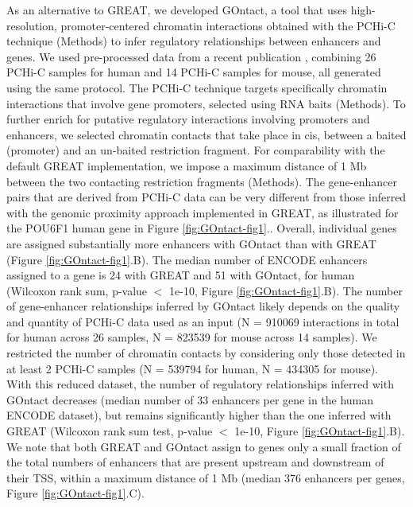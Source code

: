 As an alternative to GREAT, we developed GOntact, a tool that uses high-resolution, promoter-centered chromatin interactions obtained with the PCHi-C technique (Methods) to infer regulatory relationships between enhancers and genes. We used pre-processed data from a recent publication \citep{laverre_long-range_2022}, combining 26 PCHi-C samples for human and 14 PCHi-C samples for mouse, all generated using the same protocol. The PCHi-C technique targets specifically chromatin interactions that involve gene promoters, selected using RNA baits (Methods). To further enrich for putative regulatory interactions involving promoters and enhancers, we selected chromatin contacts that take place in cis, between a baited (promoter) and an un-baited restriction fragment. For comparability with the default GREAT implementation, we impose a maximum distance of 1 Mb between the two contacting restriction fragments (Methods). The gene-enhancer pairs that are derived from PCHi-C data can be very different from those inferred with the genomic proximity approach implemented in GREAT, as illustrated for the POU6F1 human gene in Figure \ref{fig:GOntact-fig1}.. Overall, individual genes are assigned substantially more enhancers with GOntact than with GREAT (Figure \ref{fig:GOntact-fig1}.B). The median number of ENCODE enhancers assigned to a gene is 24 with GREAT and 51 with GOntact, for human (Wilcoxon rank sum, p-value $<$ 1e-10, Figure \ref{fig:GOntact-fig1}.B). The number of gene-enhancer relationships inferred by GOntact likely depends on the quality and quantity of PCHi-C data used as an input (N = 910069 interactions in total for human across 26 samples, N = 823539 for mouse across 14 samples). We restricted the number of chromatin contacts by considering only those detected in at least 2 PCHi-C samples (N = 539794 for human, N = 434305 for mouse). With this reduced dataset, the number of regulatory relationships inferred with GOntact decreases (median number of 33 enhancers per gene in the human ENCODE dataset), but remains significantly higher than the one inferred with GREAT (Wilcoxon rank sum test, p-value $<$ 1e-10, Figure \ref{fig:GOntact-fig1}.B). We note that both GREAT and GOntact assign to genes only a small fraction of the total numbers of enhancers that are present upstream and downstream of their TSS, within a maximum distance of 1 Mb (median 376 enhancers per genes, Figure \ref{fig:GOntact-fig1}.C). \\

